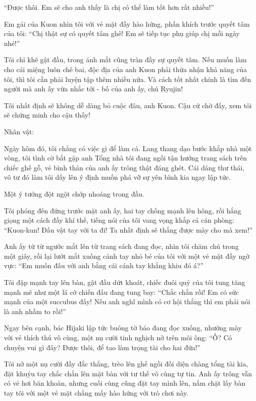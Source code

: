 \documentclass[../main.tex]{subfiles}
\begin{document}
``Được thôi. Em sẽ cho anh thấy là chị có thể làm tốt hơn rất nhiều!''

Em gái của Kuon nhìn tôi với vẻ mặt đầy hào hứng, phấn khích trước quyết tâm của tôi: ``Chị thật sự có quyết tâm ghê! Em sẽ tiếp tục phụ giúp chị mỗi ngày nhé!''

Tôi chỉ khẽ gật đầu, trong ánh mắt cũng tràn đầy sự quyết tâm. Nếu muốn làm cho cái miệng luôn chê bai, độc địa của anh Kuon phải thừa nhận khả năng của tôi, thì tôi cần phải luyện tập thêm nhiều nữa. Và cách tốt nhất chính là tìm đến người mà anh ấy vừa nhắc tới - bố của anh ấy, chú Ryujin!

Tôi nhất định sẽ không dễ dàng bỏ cuộc đâu, anh Kuon. Cậu cứ chờ đấy, xem tôi sẽ chứng minh cho cậu thấy!

\begin{center}
{\caviar\fontsize{12pt}{12pt}\selectfont Nhân vật:  }
\end{center}

Ngày hôm đó, tôi chẳng có việc gì để làm cả. Lang thang dạo bước khắp nhà một vòng, tôi tình cờ bắt gặp anh Tổng nhà tôi đang ngồi tận hưởng trang sách trên chiếc ghế gỗ, vẻ bình thản của anh ấy trông thật đáng ghét. Cái dáng thư thái, vô tư đó làm tôi dấy lên ý định muốn phá vỡ sự yên bình kia ngay lập tức.

Một ý tưởng đột ngột chớp nhoáng trong đầu.

Tôi phóng đến đứng trước mặt anh ấy, hai tay chống mạnh lên hông, rồi hắng giọng một cách đầy khí thế, tiếng nói của tôi vang vọng khắp cả căn phòng: ``Kuon-kun! Đấu vật tay với ta đi! Ta nhất định sẽ thắng được mày cho mà xem!''

Anh ấy từ từ ngước mắt lên từ trang sách đang đọc, nhìn tôi chăm chú trong một giây, rồi lại lướt mắt xuống cánh tay nhỏ bé của tôi với một vẻ mặt đầy ngờ vực: ``Em muốn đấu với anh bằng cái cánh tay khẳng khiu đó á?''

Tôi đập mạnh tay lên bàn, gật đầu dứt khoát, chiếc đuôi quỷ của tôi tung tăng mạnh mẽ như một lá cờ chiến đấu đang tung bay: ``Chắc chắn rồi! Em có sức mạnh của một succubus đấy! Nếu anh nghĩ mình có cơ hội thắng thì em phải nói là anh nhầm to rồi!''

Ngay bên cạnh, bác Hijaki lập tức buông tờ báo đang đọc xuống, nhướng mày với vẻ thích thú vô cùng, một nụ cười tinh nghịch nở trên môi ông: ``Ồ? Có chuyện vui gì đây? Được thôi, để tao làm trọng tài cho hai đứa!''

Tôi nở một nụ cười đầy đắc thắng, trèo lên ghế ngồi đối diện chàng tổng tài kia, đặt khuỷu tay chắc chắn lên mặt bàn với tư thế vô cùng tự tin. Anh ấy trông vẫn có vẻ hơi băn khoăn, nhưng cuối cùng cũng đặt tay mình lên, nắm chặt lấy bàn tay tôi với một vẻ mặt chẳng mấy hào hứng với trò chơi này.
\end{document}
